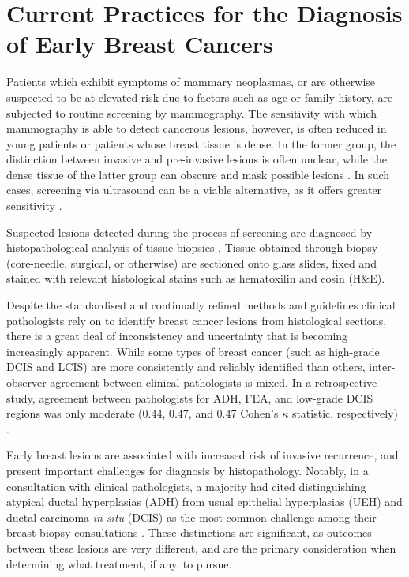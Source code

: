  \section{Current Practices for the Diagnosis of Early Breast Cancers}
Patients which exhibit symptoms of mammary neoplasmas, or are otherwise suspected to be at elevated risk due to factors such as age or family history, are subjected to routine screening by mammography. The sensitivity with which mammography is able to detect cancerous lesions, however, is often reduced in young patients or patients whose breast tissue is dense. In the former group, the distinction between invasive and pre-invasive lesions is often unclear, while the dense tissue of the latter group can obscure and mask possible lesions \citep{ayvaci2014}. In such cases, screening via ultrasound can be a viable alternative, as it offers greater sensitivity \citep{nothacker2009}.

Suspected lesions detected during the process of screening are diagnosed by histopathological analysis of tissue biopsies \citep{nccn}. Tissue obtained through biopsy (core-needle, surgical, or otherwise) are sectioned onto glass slides, fixed and stained with relevant histological stains such as hematoxilin and eosin (H\&E).

Despite the standardised and continually refined methods and guidelines clinical pathologists rely on to identify breast cancer lesions from histological sections, there is a great deal of inconsistency and uncertainty that is becoming increasingly apparent. While some types of breast cancer (such as high-grade DCIS and LCIS) are more consistently and reliably identified than others, inter-observer agreement between clinical pathologists is mixed. In a retrospective study, agreement between pathologists for ADH, FEA, and low-grade DCIS regions was only moderate (0.44, 0.47, and 0.47 Cohen's $\kappa$ statistic, respectively) \citep{gomes2014}.\par

Early breast lesions are associated with increased risk of invasive recurrence, and present important challenges for diagnosis by histopathology. Notably, in a consultation with clinical pathologists, a majority had cited distinguishing atypical ductal hyperplasias (ADH) from usual epithelial hyperplasias (UEH) and ductal carcinoma \textit{in situ} (DCIS) as the most common challenge among their breast biopsy consultations \citep{putti2005}. These distinctions are significant, as outcomes between these lesions are very different, and are the primary consideration when determining what treatment, if any, to pursue.\par

